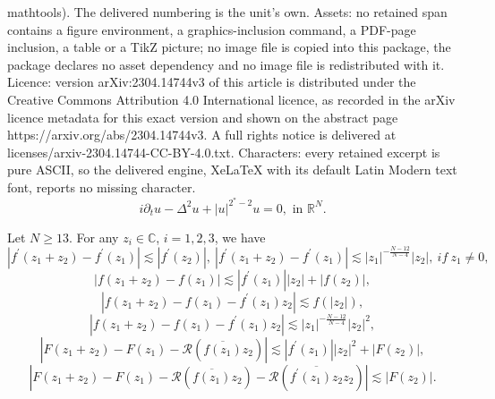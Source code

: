 \documentclass[10pt,a4paper]{amsart}
\newcommand{\R}{\mathbb{R}}
\begin{document}
mathtools). The delivered numbering is the unit's own. Assets: no retained span contains a figure environment, a graphics-inclusion command, a PDF-page inclusion, a table or a TikZ picture; no image file is copied into this package, the package declares no asset dependency and no image file is redistributed with it. Licence: version arXiv:2304.14744v3 of this article is distributed under the Creative Commons Attribution 4.0 International licence, as recorded in the arXiv licence metadata for this exact version and shown on the abstract page https://arxiv.org/abs/2304.14744v3. A full rights notice is delivered at licenses/arxiv-2304.14744-CC-BY-4.0.txt. Characters: every retained excerpt is pure ASCII, so the delivered engine, XeLaTeX with its default Latin Modern text font, reports no missing character.
\begin{equation}
\label{eq}
i\partial_t u -\Delta^2 u + |u|^{2^\ast-2} u=0,\text{ in } \R^N.
\end{equation}

\begin{lem}
Let $N\geq 13$. For any $z_i \in \mathbb{C}$, $i=1,2,3$, we have
\begin{equation}
\label{fe1}
|f^\prime (z_1 +z_2)-f^\prime (z_1)|\lesssim |f^\prime (z_2)|,\ |f^\prime (z_1 +z_2)-f^\prime (z_1)|\lesssim |z_1|^{-\frac{N-12}{N-4}} |z_2|,\ if\ z_1 \neq 0,
\end{equation}
\begin{equation}
\label{fe2}
|f(z_1 +z_2) - f(z_1)|\lesssim |f^\prime (z_1)||z_2|+|f(z_2)|,
\end{equation}
\begin{equation}
\label{fe3}
|f(z_1 +z_2) - f(z_1)-f^\prime (z_1) z_2|\lesssim f(|z_2|),
\end{equation}
\begin{equation}
\label{fe4}
|f(z_1 +z_2) - f(z_1) -f^\prime (z_1) z_2|\lesssim |z_1|^{-\frac{N-12}{N-4}}|z_2|^2,
\end{equation}
\begin{equation}
\label{fe5}
|F(z_1 +z_2) - F(z_1)- \mathcal{R} (\overline{f(z_1)} z_2)|\lesssim |f^\prime (z_1)||z_2|^2+|F(z_2)|,
\end{equation}
\begin{equation}
\label{fe6}
|F(z_1 +z_2) - F(z_1) - \mathcal{R} (\overline{f(z_1)} z_2) - \mathcal{R} (\overline{f^\prime (z_1) z_2}z_2 ) |\lesssim |F(z_2)|.
\end{equation}
\end{lem}
\end{document}
